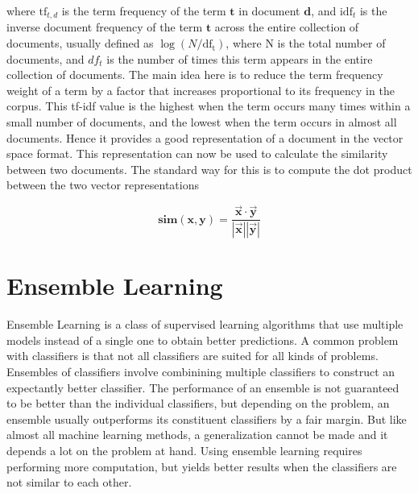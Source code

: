 where $\mathrm{tf}_{t, d}$ is the term frequency of the term $\mathbf{t}$ in document $\mathbf{d}$, and $\mathrm{idf}_{t}$ is the inverse document frequency of the term $\mathbf{t}$ across the entire collection of documents, usually defined as $\log(N / \mathrm{df_{t}})$, where $\mathrm{N}$ is the total number of documents, and $df_{t}$ is the number of times this term appears in the entire collection of documents. The main idea here is to reduce the term frequency weight of a term by a factor that increases proportional to its frequency in the corpus. This tf-idf value is the highest when the term occurs many times within a small number of documents, and the lowest when the term occurs in almost all documents. Hence it provides a good representation of a document in the vector space format. This representation can now be used to calculate the similarity between two documents. The standard way for this is to compute the dot product between the two vector representations

$$\mathbf{sim(x, y)} = \frac{\vec{\mathbf{x}} \cdot \vec{\mathbf{y}}}{|\vec{\mathbf{x}}| | \vec{\mathbf{y}}|}$$

\section{Ensemble Learning}
Ensemble Learning is a class of supervised learning algorithms that use multiple models instead of a single one to obtain better predictions. A common problem with classifiers is that not all classifiers are suited for all kinds of problems. Ensembles of classifiers involve combinining multiple classifiers to construct an expectantly better classifier. The performance of an ensemble is not guaranteed to be better than the individual classifiers, but depending on the problem, an ensemble usually outperforms its constituent classifiers by a fair margin. But like almost all machine learning methods, a generalization cannot be made and it depends a lot on the problem at hand. Using ensemble learning requires performing more computation, but yields better results when the classifiers are not similar to each other.

